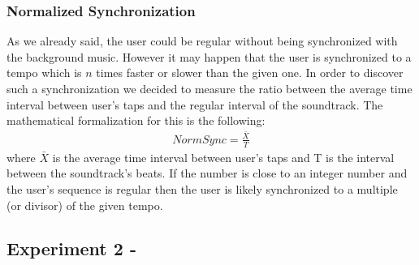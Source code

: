 \subsubsection*{Normalized Synchronization}
As we already said, the user could be regular without being synchronized with the background music. However it may happen that the user is synchronized to a tempo which is $n$ times faster or slower than the given one.
In order to discover such a synchronization we decided to measure the ratio between the average time interval between user's taps and the regular interval of the soundtrack. The mathematical formalization for this is the following:
\begin{align}
	NormSync = \frac{\bar{X}}{T}
\end{align}
where $\bar{X}$ is the average time interval between user's taps and T is the interval between the soundtrack's beats.
If the number is close to an integer number and the user's sequence is regular then the user is likely synchronized to a multiple (or divisor) of the given tempo.

\subsection*{Experiment 2 - \testsecond}